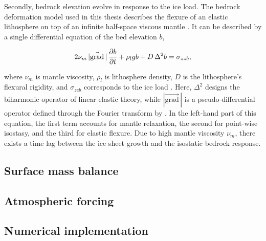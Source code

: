 \documentclass{article}
\renewcommand{\grad}[1]{\vec{\mathrm{grad}}\,#1}
\begin{document}
Secondly, bedrock elevation evolve in response to the ice load. The bedrock
deformation model used in this thesis describes the flexure of an elastic
lithosphere on top of an infinite half-space viscous mantle
\citep{Lingle.Clark.1985}. It can be described by a single differential
equation of the bed elevation $b$,

\begin{equation}
    2\nu_m\,|\grad|\,\pdv{b}{t} + \rho_l g b + D\,\Delta^2 b = \sigma_{zzb},
\end{equation}

where $\nu_m$ is mantle viscosity, $\rho_l$ is lithosphere density, $D$ is the
lithosphere's flexural rigidity, and $\sigma_{zzb}$ corresponds to the ice load
\citep{Bueler.etal.2007}. Here, $\Delta^2$ designs the biharmonic operator of
linear elastic theory, while $|\grad|$ is a pseudo-differential operator
defined through the Fourier transform by \citet[Eqn.~6]{Bueler.etal.2007}. In
the left-hand part of this equation, the first term accounts for mantle
relaxation, the second for point-wise isostasy, and the third for elastic
flexure. Due to high mantle viscosity $\nu_m$, there exists a time lag between
the ice sheet growth and the isostatic bedrock response.

\subsection{Surface mass balance}

\subsection{Atmospheric forcing}

\subsection{Numerical implementation}




\end{document}
